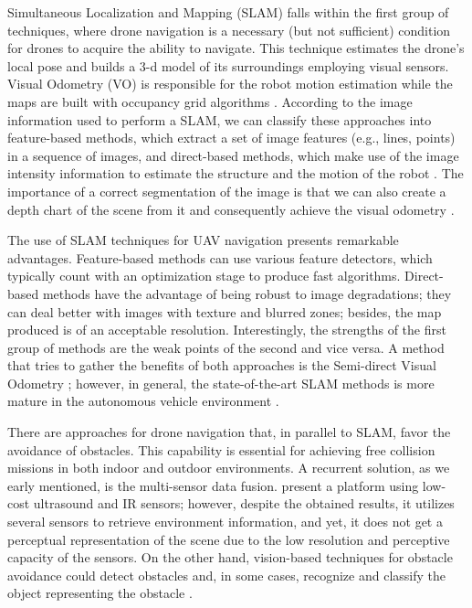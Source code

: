 Simultaneous Localization and Mapping (SLAM) falls within the first group of techniques, where drone navigation is a necessary (but not sufficient) condition for drones to acquire the ability to navigate. This technique estimates the drone's local pose and builds a 3-d model of its surroundings employing visual sensors. Visual Odometry (VO) \citep{Scaramuzza.Fraundorfer:RAM:2011} is responsible for the robot motion estimation while the maps are built with occupancy grid algorithms \citep{Thrun.Bu:AI:1996}. According to the image information used to perform a SLAM, we can classify these approaches into feature-based methods, which extract a set of image features (e.g., lines, points) in a sequence of images, and direct-based methods, which make use of the image intensity information to estimate the structure and the motion of the robot \citep{Taketomi.Uchiyama.ea:TCVA:2017}. The importance of a correct segmentation of the image is that we can also create a depth chart of the scene from it and consequently achieve the visual odometry \citep{Drouyer:Thesis:2017, Drouyer.Beucher.ea:MMASP:2017}. 

The use of SLAM techniques for UAV navigation presents remarkable advantages. Feature-based methods can use various feature detectors, which typically count with an optimization stage to produce fast algorithms. Direct-based methods have the advantage of being robust to image degradations; they can deal better with images with texture and blurred zones; besides, the map produced is of an acceptable resolution. Interestingly, the strengths of the first group of methods are the weak points of the second and vice versa. A method that tries to gather the benefits of both approaches is the Semi-direct Visual Odometry \citep{Forster.Pizzoli.ea:ICRA:2014}; however, in general, the state-of-the-art SLAM methods is more mature in the autonomous vehicle environment \citep{Singandhupe.La:IRC:2019}.

There are approaches for drone navigation that, in parallel to SLAM, favor the avoidance of obstacles. This capability is essential for achieving free collision missions in both indoor and outdoor environments. A recurrent solution, as we early mentioned, is the multi-sensor data fusion. \cite{Gageik.Benz.ea:ACCESS:2015} present a platform using low-cost ultrasound and IR sensors; however, despite the obtained results, it utilizes several sensors to retrieve environment information, and yet, it does not get a perceptual representation of the scene due to the low resolution and perceptive capacity of the sensors. On the other hand, vision-based techniques for obstacle avoidance could detect obstacles and, in some cases, recognize and classify the object representing the obstacle \citep{Li.Ye.ea:IROS:2016}. 

